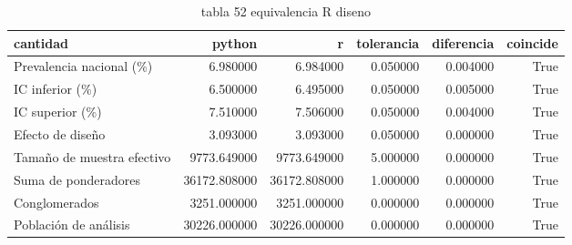 \begin{table}[htbp]
\caption{tabla 52 equivalencia R diseno}
\label{tab:tabla_52_equivalencia_R_diseno}
\begin{tabular}{lrrrrr}
\toprule
cantidad & python & r & tolerancia & diferencia & coincide \\
\midrule
Prevalencia nacional (\%) & 6.980000 & 6.984000 & 0.050000 & 0.004000 & True \\
IC inferior (\%) & 6.500000 & 6.495000 & 0.050000 & 0.005000 & True \\
IC superior (\%) & 7.510000 & 7.506000 & 0.050000 & 0.004000 & True \\
Efecto de diseño & 3.093000 & 3.093000 & 0.050000 & 0.000000 & True \\
Tamaño de muestra efectivo & 9773.649000 & 9773.649000 & 5.000000 & 0.000000 & True \\
Suma de ponderadores & 36172.808000 & 36172.808000 & 1.000000 & 0.000000 & True \\
Conglomerados & 3251.000000 & 3251.000000 & 0.000000 & 0.000000 & True \\
Población de análisis & 30226.000000 & 30226.000000 & 0.000000 & 0.000000 & True \\
\bottomrule
\end{tabular}
\end{table}
